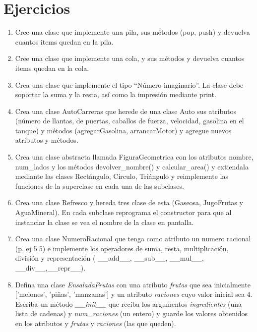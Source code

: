 \newpage

\section{Ejercicios}

\begin{enumerate}
\item Cree una clase que implemente una pila, sus métodos (pop, push) y devuelva cuantos items quedan en la pila.

\item Cree una clase que implemente una cola, y sus métodos y devuelva cuantos items quedan en la cola.

\item Crea una clase que implemente el tipo ``Número imaginario''. La clase debe soportar la suma y la resta, así como la impresión mediante print.

\item Crea una clase AutoCarreras que herede de una clase Auto sus atributos (número de llantas, de puertas, caballos de fuerza, velocidad, gasolina en el tanque) y métodos (agregarGasolina, arrancarMotor) y agregue nuevos atributos y métodos.

\item Crea una clase abstracta llamada FiguraGeometrica con los atributos nombre, num\_lados y los métodos devolver\_nombre() y calcular\_area() y extiendala mediante las clases Rectángulo, Círculo, Triángulo y reimplemente las funciones de la superclase en cada una de las subclases.

\item Crea una clase Refresco y hereda tres clase de esta (Gaseosa, JugoFrutas y AguaMineral). En cada subclase reprograma el constructor para que al instanciar la clase se vea el nombre de la clase en pantalla.

\item Crea una clase NumeroRacional que tenga como atributo un numero racional (p. ej 5.5) e implemente los operadores de suma, resta, multiplicación, división y representación ( \_\_add\_\_, \_\_sub\_\_, \_\_mul\_\_, \_\_div\_\_,\_\_repr\_\_).

\item Defina una clase \textit{EnsaladaFrutas} con una atributo \textit{frutas} que sea inicialmente ['melones', 'piñas', 'manzanas'] y un atributo \textit{raciones} cuyo valor inicial sea 4. Escriba un método \textit{\_\_init\_\_} que reciba los argumentos \textit{ingredientes} (una lista de cadenas) y \textit{num\_raciones} (un entero) y guarde los valores obtenidos en los atributos y \textit{frutas} y \textit{raciones} (las que queden).


\end{enumerate}
